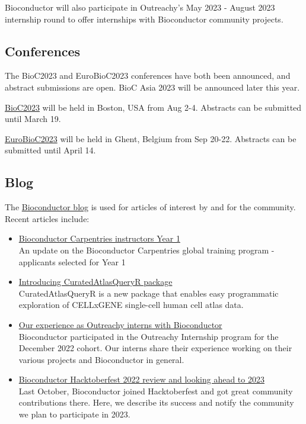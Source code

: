 Bioconductor will also participate in Outreachy's May 2023 - August 2023
internship round to offer internships with Bioconductor community projects.

\hypertarget{conferences}{%
\subsection{Conferences}\label{conferences}}

The BioC2023 and EuroBioC2023 conferences have both been announced, and abstract submissions are open. BioC Asia 2023 will be announced later this year.

\href{https://bioc2023.bioconductor.org/}{BioC2023} will be held in Boston, USA from Aug 2-4. Abstracts can be submitted until March 19.

\href{https://eurobioc2023.bioconductor.org/}{EuroBioC2023} will be held in Ghent, Belgium from Sep 20-22. Abstracts can be submitted until April 14.

\hypertarget{blog}{%
\subsection{Blog}\label{blog}}

The \href{https://bioconductor.github.io/biocblog/}{Bioconductor blog} is used for articles of interest by and for the community. Recent articles include:

\begin{itemize}
\item
  \href{https://bioconductor.github.io/biocblog/posts/2023-02-24-carpentries-update/}{Bioconductor Carpentries instructors Year 1}\\
  An update on the Bioconductor Carpentries global training program - applicants selected for Year 1
\item
  \href{https://bioconductor.github.io/biocblog/posts/2023-02-23-CuratedAtlasQueryR/}{Introducing CuratedAtlasQueryR package}\\
  CuratedAtlasQueryR is a new package that enables easy programmatic exploration of CELLxGENE single-cell human cell atlas data.
\item
  \href{https://bioconductor.github.io/biocblog/posts/2023-01-22-OutreachyInternship/}{Our experience as Outreachy interns with Bioconductor}\\
  Bioconductor participated in the Outreachy Internship program for the December 2022 cohort. Our interns share their experience working on their various projects and Bioconductor in general.
\item
  \href{https://bioconductor.github.io/biocblog/posts/2023-01-20-hacktoberfest/}{Bioconductor Hacktoberfest 2022 review and looking ahead to 2023}\\
  Last October, Bioconductor joined Hacktoberfest and got great community contributions there. Here, we describe its success and notify the community we plan to participate in 2023.
\end{itemize}

